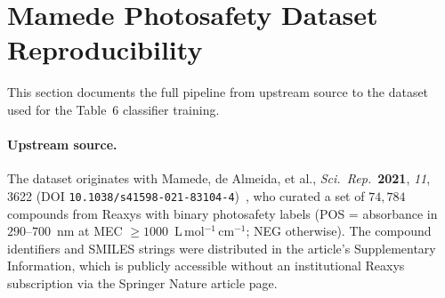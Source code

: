 \documentclass[journal=jcisd8,manuscript=suppinfo]{achemso}
\begin{document}
\section{Mamede Photosafety Dataset Reproducibility}
\label{si:mamede_reproducibility}

This section documents the full pipeline from upstream source to the dataset used for the Table~6 classifier training.

\paragraph{Upstream source.}
The dataset originates with Mamede, de Almeida, et al., \emph{Sci.\ Rep.}\ \textbf{2021}, \textit{11}, 3622 (DOI \texttt{10.1038/s41598-021-83104-4})~\cite{mamede2021machine}, who curated a set of $74{,}784$ compounds from Reaxys with binary photosafety labels (POS = absorbance in $290$--$700$~nm at MEC $\geq 1000$~L\,mol$^{-1}$\,cm$^{-1}$; NEG otherwise). The compound identifiers and SMILES strings were distributed in the article's Supplementary Information, which is publicly accessible without an institutional Reaxys subscription via the Springer Nature article page.
\end{document}
